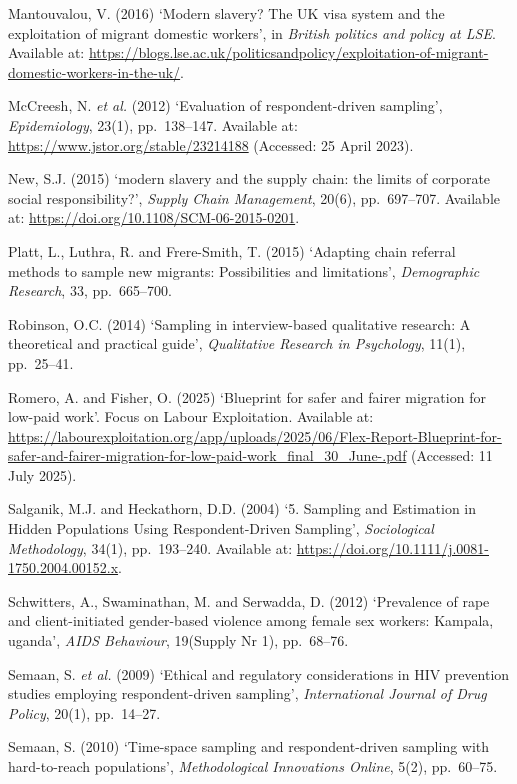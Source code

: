 \documentclass[
  12pt,
  letterpaper,
  DIV=11,
  numbers=noendperiod]{scrartcl}
\begin{document}
Mantouvalou, V. (2016) `Modern slavery? The UK visa system and the
exploitation of migrant domestic workers', in \emph{British politics and
policy at LSE}. Available at:
\url{https://blogs.lse.ac.uk/politicsandpolicy/exploitation-of-migrant-domestic-workers-in-the-uk/}.

McCreesh, N. \emph{et al.} (2012) `Evaluation of respondent-driven
sampling', \emph{Epidemiology}, 23(1), pp.~138--147. Available at:
\url{https://www.jstor.org/stable/23214188} (Accessed: 25 April 2023).

New, S.J. (2015) `modern slavery and the supply chain: the limits of
corporate social responsibility?', \emph{Supply Chain Management},
20(6), pp.~697--707. Available at:
\url{https://doi.org/10.1108/SCM-06-2015-0201}.

Platt, L., Luthra, R. and Frere-Smith, T. (2015) `Adapting chain
referral methods to sample new migrants: Possibilities and limitations',
\emph{Demographic Research}, 33, pp.~665--700.

Robinson, O.C. (2014) `Sampling in interview-based qualitative research:
A theoretical and practical guide', \emph{Qualitative Research in
Psychology}, 11(1), pp.~25--41.

Romero, A. and Fisher, O. (2025) `Blueprint for safer and fairer
migration for low-paid work'. Focus on Labour Exploitation. Available
at:
\url{https://labourexploitation.org/app/uploads/2025/06/Flex-Report-Blueprint-for-safer-and-fairer-migration-for-low-paid-work_final_30_June-.pdf}
(Accessed: 11 July 2025).

Salganik, M.J. and Heckathorn, D.D. (2004) `5. Sampling and Estimation
in Hidden Populations Using Respondent-Driven Sampling',
\emph{Sociological Methodology}, 34(1), pp.~193--240. Available at:
\url{https://doi.org/10.1111/j.0081-1750.2004.00152.x}.

Schwitters, A., Swaminathan, M. and Serwadda, D. (2012) `Prevalence of
rape and client-initiated gender-based violence among female sex
workers: Kampala, uganda', \emph{AIDS Behaviour}, 19(Supply Nr 1),
pp.~68--76.

Semaan, S. \emph{et al.} (2009) `Ethical and regulatory considerations
in HIV prevention studies employing respondent-driven sampling',
\emph{International Journal of Drug Policy}, 20(1), pp.~14--27.

Semaan, S. (2010) `Time-space sampling and respondent-driven sampling
with hard-to-reach populations', \emph{Methodological Innovations
Online}, 5(2), pp.~60--75.
\end{document}
